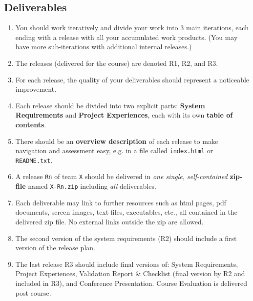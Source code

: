 \subsection{Deliverables}
  \begin{enumerate}[nolistsep]
    \item You should work iteratively and divide your work into 3 main iterations, each ending with a release with all your accumulated work products. (You may have more sub-iterations with additional internal releases.)
    \item The releases (delivered for the course) are denoted R1, R2, and R3.
    \item For each release, the quality of your deliverables should represent a noticeable improvement.
    \item Each release should be divided into two explicit parts: {\bf System Requirements} and {\bf Project Experiences}, each with its own {\bf table of contents}.
    \item There should be an {\bf overview description} of each release to make navigation and assessment easy, e.g. in a file called \verb+index.html+ or \verb+README.txt+.
    \item A release \verb+Rn+ of team \verb+X+ should be delivered in {\it one single, self-contained} {\bf zip-file} named \verb+X-Rn.zip+ including {\it all} deliverables.
    \item Each deliverable may link to further resources such as html pages, pdf documents, screen images, text files, executables, etc., all contained in the delivered zip file. No external links outside the zip are allowed.
    \item The second version of the system requirements (R2) should include a first version of the release plan.
    \item The last release R3 should include final versions of: System Requirements, Project Experiences, Validation Report \& Checklist (final version by R2 and included in R3), and Conference Presentation. Course Evaluation is delivered post course.


\end{enumerate}
